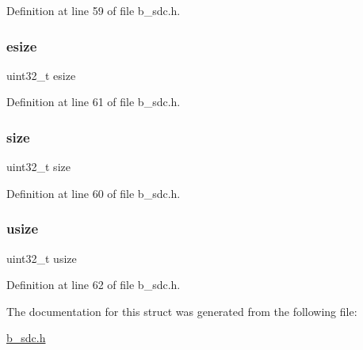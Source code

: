 Definition at line 59 of file b\+\_\+sdc.\+h.

\mbox{\label{structb_s_d_c___struct__t_a7724841d84bdcadcc73fac6cc993563c}} 
\subsubsection{\texorpdfstring{esize}{esize}}
{\footnotesize\ttfamily uint32\+\_\+t esize}



Definition at line 61 of file b\+\_\+sdc.\+h.

\mbox{\label{structb_s_d_c___struct__t_ab2c6b258f02add8fdf4cfc7c371dd772}} 
\subsubsection{\texorpdfstring{size}{size}}
{\footnotesize\ttfamily uint32\+\_\+t size}



Definition at line 60 of file b\+\_\+sdc.\+h.

\mbox{\label{structb_s_d_c___struct__t_a546dee965d95ce52190c06bfb12a5d85}} 
\subsubsection{\texorpdfstring{usize}{usize}}
{\footnotesize\ttfamily uint32\+\_\+t usize}



Definition at line 62 of file b\+\_\+sdc.\+h.



The documentation for this struct was generated from the following file\+:\begin{DoxyCompactItemize}
\item 
\mbox{\hyperlink{b__sdc_8h}{b\+\_\+sdc.\+h}}\end{DoxyCompactItemize}
